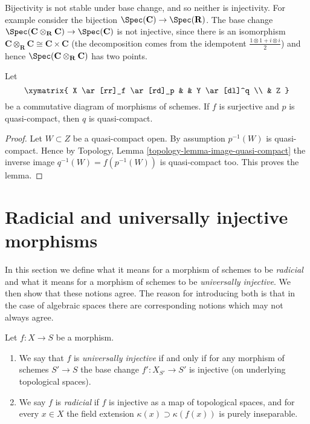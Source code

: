 \begin{example}
\label{example-injective-not-preserved-base-change}
Bijectivity is not stable under base change, and so neither is injectivity.
For example consider the bijection
$\Spec(\mathbf{C}) \to \Spec(\mathbf{R})$.
The base change
$\Spec(\mathbf{C} \otimes_{\mathbf{R}} \mathbf{C}) \to
\Spec(\mathbf{C})$
is not injective, since there is an isomorphism
$\mathbf{C} \otimes_{\mathbf{R}} \mathbf{C} \cong \mathbf{C} \times \mathbf{C}$
(the decomposition comes from the idempotent
$\frac{1 \otimes 1 + i \otimes i}{2}$) and hence
$\Spec(\mathbf{C} \otimes_{\mathbf{R}} \mathbf{C})$ has two points.
\end{example}

\begin{lemma}
\label{lemma-surjection-from-quasi-compact}
Let
$$
\xymatrix{
X \ar[rr]_f \ar[rd]_p & &
Y \ar[dl]^q \\
& Z
}
$$
be a commutative diagram of morphisms of schemes.
If $f$ is surjective and $p$ is quasi-compact, then $q$ is quasi-compact.
\end{lemma}

\begin{proof}
Let $W \subset Z$ be a quasi-compact open. By assumption $p^{-1}(W)$
is quasi-compact. Hence by
Topology, Lemma \ref{topology-lemma-image-quasi-compact}
the inverse image $q^{-1}(W) = f(p^{-1}(W))$ is quasi-compact too.
This proves the lemma.
\end{proof}




\section{Radicial and universally injective morphisms}
\label{section-radicial}

\noindent
In this section we define what it means for a morphism of schemes to
be {\it radicial} and what it means for a morphism of schemes to be
{\it universally injective}. We then show that these notions agree.
The reason for introducing both is that in the case of algebraic spaces
there are corresponding notions which may not always agree.

\begin{definition}
\label{definition-universally-injective}
Let $f : X \to S$ be a morphism.
\begin{enumerate}
\item We say that $f$ is {\it universally injective} if and only
if for any morphism of schemes $S' \to S$ the base change
$f' : X_{S'} \to S'$ is injective (on underlying topological spaces).
\item We say $f$ is {\it radicial} if $f$ is injective as a
map of topological spaces, and for every $x \in X$ the field
extension $\kappa(x) \supset \kappa(f(x))$ is purely inseparable.
\end{enumerate}
\end{definition}

